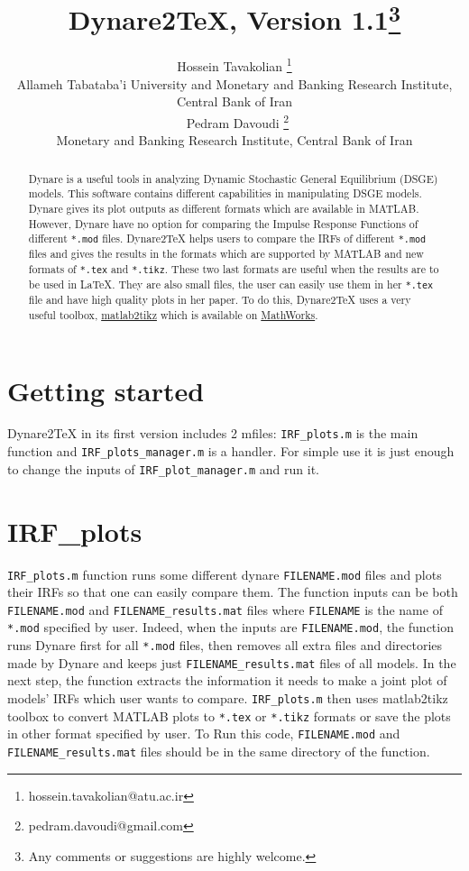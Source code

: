 \documentclass[11pt,a4paper]{article}
\title{Dynare2TeX, Version 1.1\thanks{Any comments or suggestions are highly welcome.}}
\author{
Hossein Tavakolian \thanks{hossein.tavakolian@atu.ac.ir}\\
Allameh Tabataba'i University and Monetary and Banking Research Institute, Central Bank of Iran\\\
Pedram Davoudi \thanks{pedram.davoudi@gmail.com}\\
Monetary and Banking Research Institute, Central Bank of Iran}
\begin{document}
\maketitle
\begin{abstract}
Dynare is a useful tools in analyzing Dynamic Stochastic General Equilibrium (DSGE) models. This software contains different capabilities in manipulating DSGE models. Dynare gives its plot outputs as different formats which are available in MATLAB. However, Dynare have no option for comparing the Impulse Response Functions of different \texttt{*.mod} files. Dynare2TeX helps users to compare the IRFs of different \texttt{*.mod} files and gives the results in the formats which are supported by MATLAB and new formats of \texttt{*.tex} and \texttt{*.tikz}. These two last formats are useful when the results are to be used in \LaTeX. They are also small files, the user can easily use them in her \texttt{*.tex} file and have high quality plots in her paper. To do this, Dynare2TeX uses a very useful toolbox, \href{<http://www.mathworks.com/matlabcentral/fileexchange/22022-matlab2tikz-matlab2tikz>}{matlab2tikz} which is available on \href{<http://www.mathworks.com/matlabcentral>}{MathWorks}.
\end{abstract}

\section{Getting started}
Dynare2TeX in its first version includes 2 mfiles: \texttt{IRF\_plots.m} is the main function and \texttt{IRF\_plots\_manager.m} is a handler. For simple use it is just enough to change the inputs of \texttt{IRF\_plot\_manager.m} and run it. 

\section{IRF\_plots}
\texttt{IRF\_plots.m} function runs some different dynare \texttt{FILENAME.mod} files and plots their IRFs so that one can easily compare them. The function inputs can be both \texttt{FILENAME.mod} and \texttt{FILENAME_results.mat} files where \texttt{FILENAME} is the name of \texttt{*.mod} specified by user. Indeed, when the inputs are \texttt{FILENAME.mod}, the function runs Dynare first for all \texttt{*.mod} files, then removes all extra files and directories made by Dynare and keeps just \texttt{FILENAME_results.mat} files of all models. In the next step, the function extracts the information it needs to make a joint plot of models' IRFs which user wants to compare. \texttt{IRF\_plots.m} then uses matlab2tikz toolbox to convert MATLAB plots to \texttt{*.tex} or \texttt{*.tikz} formats or save the plots in other format specified by user. To Run this code, \texttt{FILENAME.mod} and \texttt{FILENAME_results.mat} files should be in the same directory of the function.
\end{document}
